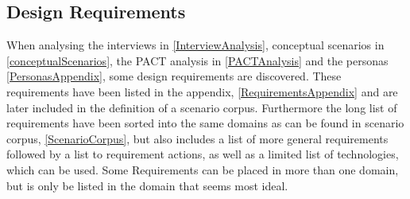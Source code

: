 \subsection{Design Requirements} \label{DesignRequirements}
When analysing the interviews in \cref{InterviewAnalysis}, conceptual scenarios in \cref{conceptualScenarios}, the PACT analysis in \cref{PACTAnalysis} and the personas \cref{PersonasAppendix}, some design requirements are discovered. These requirements have been listed in the appendix, \cref{RequirementsAppendix} and are later included in the definition of a scenario corpus. Furthermore the long list of requirements have been sorted into the same domains as can be found in scenario corpus, \cref{ScenarioCorpus}, but also includes a list of more general requirements followed by a list to requirement actions, as well as a limited list of technologies, which can be used. Some Requirements can be placed in more than one domain, but is only be listed in the domain that seems most ideal.